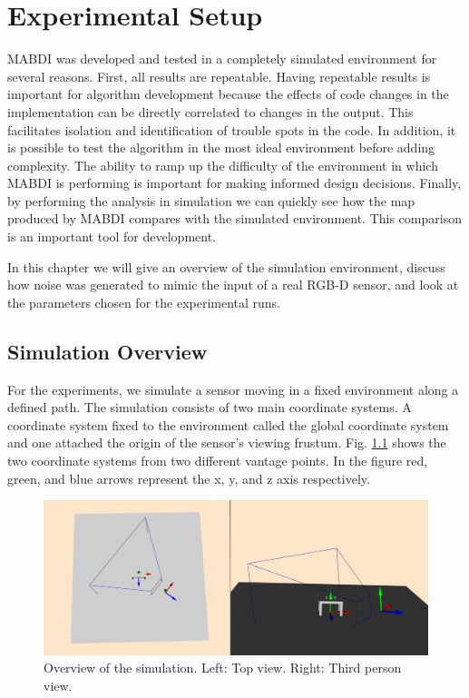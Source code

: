 \chapter{Experimental Setup}	\label{chapter:experimental_setup}

MABDI was developed and tested in a completely simulated environment for several
reasons. First, all results are repeatable. Having repeatable results is
important for algorithm development because the effects of code changes in the
implementation can be directly correlated to changes in the output. This
facilitates isolation and identification of trouble spots in the code. In
addition, it is possible to test the algorithm in the most ideal environment
before adding complexity. The ability to ramp up the difficulty of the
environment in which MABDI is performing is important for making informed design
decisions. Finally, by performing the analysis in simulation we can quickly see
how the map produced by MABDI compares with the simulated environment. This
comparison is an important tool for development.

In this chapter we will give an overview of the simulation environment, discuss
how noise was generated to mimic the input of a real RGB-D sensor, and look at
the parameters chosen for the experimental runs.

\section{Simulation Overview}

For the experiments, we simulate a sensor moving in a fixed environment along a
defined path. The simulation consists of two main coordinate systems. A
coordinate system fixed to the environment called the global coordinate system
and one attached the origin of the sensor's viewing frustum. Fig.
\ref{fig:simulation_overview} shows the two coordinate systems from two
different vantage points. In the figure red, green, and blue arrows represent
the x, y, and z axis respectively.

\begin{figure}[h]%
\centering
  \includegraphics[width=\textwidth]{figures/diagram_simulation_overview.png}
  \caption{Overview of the simulation. Left: Top view. Right: Third person view. }
  \label{fig:simulation_overview}
\end{figure}

